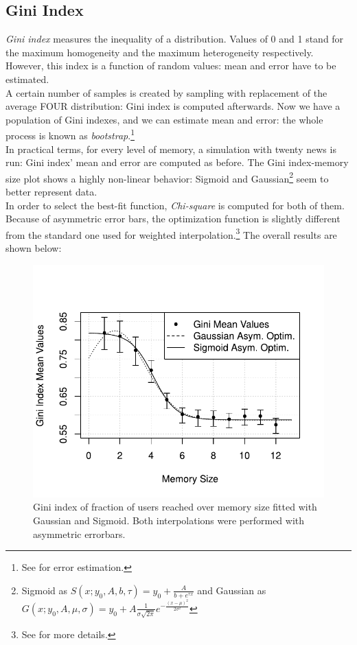 \subsection{Gini Index}
\textit{Gini index}\cite{ginindex} measures the inequality of a
distribution. Values of 0 and 1 stand for the
maximum homogeneity and the maximum heterogeneity respectively.
However, this index is a function of random values: mean and
error have to be estimated.\\
A certain number of samples is created by sampling with replacement
of the average FOUR distribution: Gini index is
computed afterwards.
Now we have a population of Gini indexes, and we can estimate
mean and error: the whole process is known as
\textit{bootstrap}.\footnote{
  See  for error estimation.
}\cite{bootstrap}\\
In practical terms, for every level of  memory, a simulation with
twenty news is run: Gini index' mean and error are computed
as before.
The Gini index-memory size plot shows a highly non-linear
behavior: Sigmoid and Gaussian\footnote{
  Sigmoid as
  $S(x;y_0, A, b, \tau) = y_0 + \frac{A}{b + e^{\tau x}}$ and
  Gaussian as
  $G(x; y_0, A, \mu, \sigma) = y_0 + A\frac{1}{\sigma\sqrt{2\pi}}e^{-\frac{(x-\mu)^2}{2\sigma^2}}$
}
seem to better represent data.\\
In order to select the best-fit function, \textit{Chi-square} is
computed for both of them. \\
Because of asymmetric error bars, the optimization function is
slightly different from the standard one used for weighted
interpolation.\footnote{See  for more details.}
The overall results are shown below:
%
%
\begin{figure}[h]
  \centering
  \includegraphics[trim={0cm 0cm 0cm 1cm},clip,width=.8\columnwidth]{img/gini.pdf}
  \caption[Gini index over memory size]
  {Gini index of fraction of users reached over memory size
    fitted with Gaussian and Sigmoid.
    Both interpolations were performed with asymmetric errorbars.
  }
  \label{fig:gini}
\end{figure}
